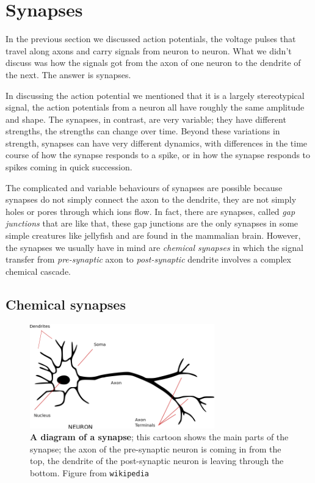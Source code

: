 \documentclass[12pt]{article}
\begin{document}
\section*{Synapses}

In the previous section we discussed action potentials, the voltage
pulses that travel along axons and carry signals from neuron to
neuron. What we didn't discuss was how the signals got from the axon
of one neuron to the dendrite of the next. The answer is synapses. 

In discussing the action potential we mentioned that it is a largely
stereotypical signal, the action potentials from a neuron all have
roughly the same amplitude and shape. The synapses, in contrast, are
very variable; they have different strengths, the strengths can change
over time. Beyond these variations in strength, synapses can have very
different dynamics, with differences in the time course of how the
synapse responds to a spike, or in how the synapse responds to spikes
coming in quick succession.

The complicated and variable behaviours of synapses are possible
because synapses do not simply connect the axon to the dendrite, they
are not simply holes or pores through which ions flow. In fact, there
are synapses, called \textsl{gap junctions} that are like that, these
gap junctions are the only synapses in some simple creatures like
jellyfish and are found in the mammalian brain. However, the synapses
we usually have in mind are \textsl{chemical synapses} in which the
signal transfer from \textsl{pre-synaptic} axon to
\textsl{post-synaptic} dendrite involves a complex chemical cascade.


\subsection*{Chemical synapses} 

\begin{figure}[tbhp]
  \begin{center}
    \includegraphics[width=8cm]{neuron.png}
    \end{center}
  \caption{\textbf{A diagram of a synapse}; this cartoon shows the
    main parts of the synapse; the axon of the pre-synaptic neuron is
    coming in from the top, the dendrite of the post-synaptic neuron
    is leaving through the bottom. Figure from
    \texttt{wikipedia}\label{fig_synapse}}
\end{figure}
\end{document}

